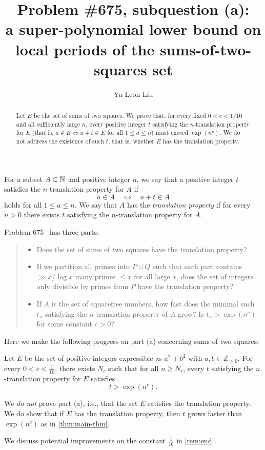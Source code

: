 \documentclass{amsart}
\title[\Erdos Problem \#675(a)]{\Erdos Problem \#675, subquestion (a): \\ {\tiny a super-polynomial lower bound on local periods of the sums-of-two-squares set}}
\author{Yu Leon Liu}
\begin{document}
\begin{abstract}
Let $E$ be the set of sums of two squares. We prove that, for every fixed
$0 < c < 1/10$ and all sufficiently large $n$, every positive integer $t$
satisfying the $n$-translation property for $E$ (that is, $a \in E
\Longleftrightarrow a + t \in E$ for all $1 \leq a \leq n$) must exceed
$\exp(n^c)$. We do not address the existence of such $t$, that is,
whether $E$ has the translation property.
\end{abstract}

    \maketitle

\begin{definition}\label{def:trans}
    For a subset $A \subset \mathbb{N}$ and positive integer $n$, we say that a positive integer $t$ satisfies the $n$-translation property for $A$ if
    \[
    a\in A \quad \Longleftrightarrow \quad a+t \in A
    \]
    holds for all $1 \leq a \leq n$. We say that $A$ has the \textit{translation property} if for every $n > 0$ there exists $t$ satisfying the $n$-translation property for $A$.
\end{definition}

Problem 675~\cite{bloom675} has three parts:
\begin{quote}
\begin{itemize}[leftmargin=1.2em]
\item[(a)] Does the set of sums of two squares have the translation property?
\item[(b)] If we partition all primes into $P\sqcup Q$ such that each part contains $\gg x/\log x$ many primes $\le x$ for all large $x$, does the set of integers only divisible by primes from $P$ have the translation property?
\item[(c)] If $A$ is the set of squarefree numbers, how fast does the minimal such $t_n$ satisfying the $n$-translation property of $A$ grow? Is $t_n>\exp(n^c)$ for some constant $c>0$?
\end{itemize}
\end{quote}

Here we make the following progress on part (a) concerning sums of two squares:
\begin{theorem}\label{thm:main-thm}
    Let $E$ be the set of positive integers expressible as $a^2 + b^2$ with $a, b \in \mathbb Z_{\geq 0}$. For every $0 < c < \frac{1}{10}$, there exists $N_c$ such that for all $n \geq N_c$, every $t$ satisfying the $n$-translation property for $E$ satisfies
\[
    t > \exp(n^c).
\]
\end{theorem}
\begin{remark}
    We \emph{do not} prove part (a), i.e., that the set $E$ satisfies the translation property. We do show that if $E$ has the translation property, then $t$ grows faster than $\exp(n^c)$ as in \cref{thm:main-thm}.
\end{remark}
\begin{remark}
    We discuss potential improvements on the constant $\frac{1}{10}$ in \cref{rem:end}.
\end{remark}
\end{document}
